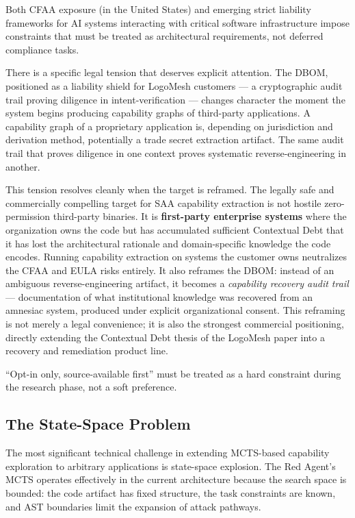 \documentclass[11pt, a4paper]{article}
\begin{document}
Both CFAA exposure (in the United States) and emerging strict liability frameworks for AI systems interacting with critical software infrastructure impose constraints that must be treated as architectural requirements, not deferred compliance tasks.

There is a specific legal tension that deserves explicit attention. The DBOM, positioned as a liability shield for LogoMesh customers — a cryptographic audit trail proving diligence in intent-verification — changes character the moment the system begins producing capability graphs of third-party applications. A capability graph of a proprietary application is, depending on jurisdiction and derivation method, potentially a trade secret extraction artifact. The same audit trail that proves diligence in one context proves systematic reverse-engineering in another.

This tension resolves cleanly when the target is reframed. The legally safe and commercially compelling target for SAA capability extraction is not hostile zero-permission third-party binaries. It is \textbf{first-party enterprise systems} where the organization owns the code but has accumulated sufficient Contextual Debt that it has lost the architectural rationale and domain-specific knowledge the code encodes. Running capability extraction on systems the customer owns neutralizes the CFAA and EULA risks entirely. It also reframes the DBOM: instead of an ambiguous reverse-engineering artifact, it becomes a \emph{capability recovery audit trail} — documentation of what institutional knowledge was recovered from an amnesiac system, produced under explicit organizational consent. This reframing is not merely a legal convenience; it is also the strongest commercial positioning, directly extending the Contextual Debt thesis of the LogoMesh paper into a recovery and remediation product line.

``Opt-in only, source-available first'' must be treated as a hard constraint during the research phase, not a soft preference.

\subsection{The State-Space Problem}

The most significant technical challenge in extending MCTS-based capability exploration to arbitrary applications is state-space explosion. The Red Agent's MCTS operates effectively in the current architecture because the search space is bounded: the code artifact has fixed structure, the task constraints are known, and AST boundaries limit the expansion of attack pathways.
\end{document}
